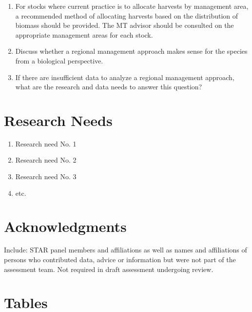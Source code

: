 \documentclass[12pt,]{article}
\providecommand{\tightlist}{%
  \setlength{\itemsep}{0pt}\setlength{\parskip}{0pt}}
\begin{document}
\begin{enumerate}
\def\labelenumi{\arabic{enumi}.}
\tightlist
\item
  For stocks where current practice is to allocate harvests by
  management area, a recommended method of allocating harvests based on
  the distribution of biomass should be provided. The MT advisor should
  be consulted on the appropriate management areas for each stock.
\item
  Discuss whether a regional management approach makes sense for the
  species from a biological perspective.
\item
  If there are insufficient data to analyze a regional management
  approach, what are the research and data needs to answer this
  question?
\end{enumerate}

\section{Research Needs}\label{research-needs}

\begin{enumerate}

\item Research need No. 1

\item Research need No. 2

\item Research need No. 3

\item etc.

\end{enumerate}

\section{Acknowledgments}\label{acknowledgments}

Include: STAR panel members and affiliations as well as names and
affiliations of persons who contributed data, advice or information but
were not part of the assessment team. Not required in draft assessment
undergoing review.

\newpage

\FloatBarrier

\section{Tables}\label{tables}
\end{document}
